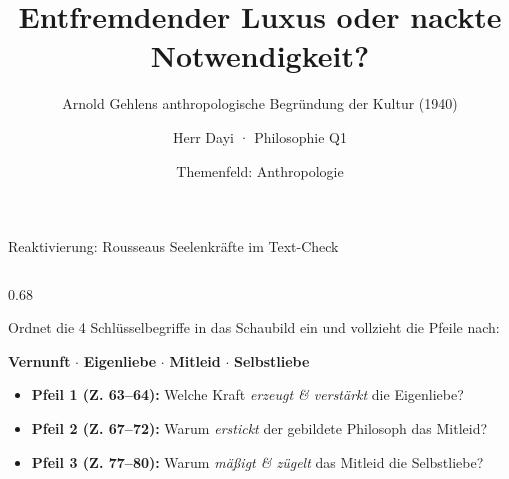 \documentclass[aspectratio=169, 10pt]{beamer}
\title{Entfremdender Luxus oder nackte Notwendigkeit?}
\subtitle{Arnold Gehlens anthropologische Begründung der Kultur (1940)}
\author{Herr Dayi · Philosophie Q1}
\date{Themenfeld: Anthropologie}
\begin{document}
\begin{frame}[plain]
    \maketitle
\end{frame}

\begin{frame}{Reaktivierung: Rousseaus Seelenkräfte im Text-Check}
    \vspace{-0.25cm}
    \begin{columns}[T]
        \begin{column}{0.68\textwidth}
            \begin{tcolorbox}[infoCard, title={\faTasks\ Blitz-Auftrag (Partnerarbeit · 3–4 Minuten)}]
                \footnotesize
                Ordnet die 4 Schlüsselbegriffe in das Schaubild ein und vollzieht die Pfeile nach:\\
                \begin{center}
                    \textbf{Vernunft} $\cdot$ \textbf{Eigenliebe} $\cdot$ \textbf{Mitleid} $\cdot$ \textbf{Selbstliebe}
                \end{center}
            \end{tcolorbox}

            \vspace{0.12cm}
            \begin{tcolorbox}[alertCard, title={\faSearch\ Text-Spurensuche (Zeilenangaben vom Arbeitsblatt)}]
                \scriptsize
                \begin{itemize}\setlength{\itemsep}{2pt}
                    \item \textbf{Pfeil 1 (Z. 63–64):} Welche Kraft \textit{erzeugt \& verstärkt} die Eigenliebe?
                    \item \textbf{Pfeil 2 (Z. 67–72):} Warum \textit{erstickt} der gebildete Philosoph das Mitleid?
                    \item \textbf{Pfeil 3 (Z. 77–80):} Warum \textit{mäßigt \& zügelt} das Mitleid die Selbstliebe?
                \end{itemize}
            \end{tcolorbox}
        \end{column}


\end{columns}
\end{frame}
\end{document}
